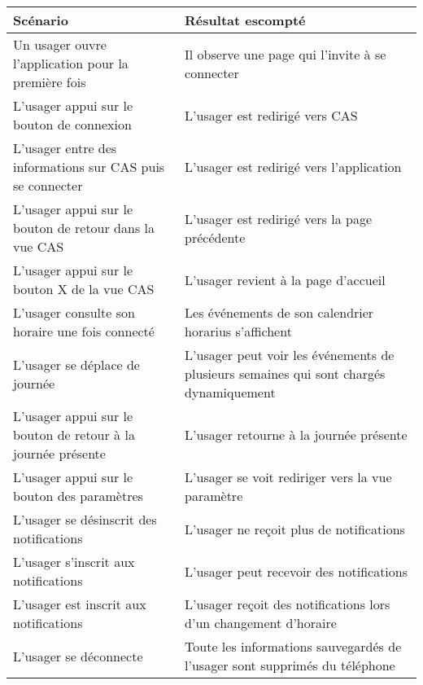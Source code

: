 \begin{tabular}{P{0.3\textwidth}P{0.6\textwidth}}
\hline
\bf Scénario
&
\bf Résultat escompté
\\
\hline
\hline
Un usager ouvre l'application pour la première fois
&
Il observe une page qui l'invite à se connecter
\\
L'usager appui sur le bouton de connexion
&
L'usager est redirigé vers CAS
\\
L'usager entre des informations sur CAS puis se connecter
&
L'usager est redirigé vers l'application
\\
L'usager appui sur le bouton de retour dans la vue CAS
&
L'usager est redirigé vers la page précédente
\\
L'usager appui sur le bouton X de la vue CAS
&
L'usager revient à la page d'accueil
\\
L'usager consulte son horaire une fois connecté
&
Les événements de son calendrier horarius s'affichent
\\
L'usager se déplace de journée
&
L'usager peut voir les événements de plusieurs semaines qui sont chargés dynamiquement
\\
L'usager appui sur le bouton de retour à la journée présente
&
L'usager retourne à la journée présente
\\
L'usager appui sur le bouton des paramètres
&
L'usager se voit rediriger vers la vue paramètre
\\
L'usager se désinscrit des notifications
&
L'usager ne reçoit plus de notifications
\\
L'usager s'inscrit aux notifications
&
L'usager peut recevoir des notifications
\\
L'usager est inscrit aux notifications
&
L'usager reçoit des notifications lors d'un changement d'horaire
\\
L'usager se déconnecte
&
Toute les informations sauvegardés de l'usager sont supprimés du téléphone
\\
\hline
\end{tabular}
